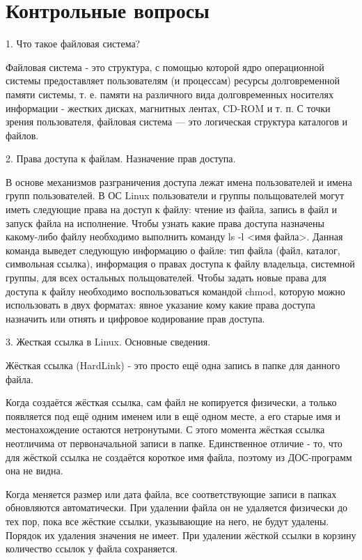 \section*{Контрольные вопросы}
1. Что такое файловая система?

Файловая система - это структура, с помощью которой ядро операционной системы предоставляет пользователям (и процессам) ресурсы долговременной памяти системы, т. е. памяти на различного вида долговременных носителях информации  -  жестких дисках, магнитных лентах, CD-ROM и т. п. С точки зрения пользователя, файловая система   —   это логическая структура каталогов и файлов. 

2. Права доступа к файлам. Назначение прав доступа.

В основе механизмов разграничения доступа лежат имена пользователей и имена групп пользователей. В ОС Linux пользователи и группы польщователей могут иметь следующие права на доступ к файлу: чтение из файла, запись в файл и запуск файла на исполнение. Чтобы узнать какие права доступа назначены какому-либо файлу необходимо выполнить команду ls -l <имя файла>. Данная команда выведет следующую информацию о файле: тип файла (файл, каталог, символьная ссылка), информация о правах доступа к файлу владельца, системной группы, для всех остальных польщователей. Чтобы задать новые права для доступа к файлу необходимо воспользоваться командой chmod, которую можно использовать в двух форматах: явное указание кому какие права доступа назначить или отнять и цифровое кодирование прав доступа.

3. Жесткая ссылка в Linux. Основные сведения.

Жёсткая ссылка (HardLink) - это просто ещё одна запись в папке для данного файла.

Когда создаётся жёсткая ссылка, сам файл не копируется физически, а только появляется под ещё одним именем или в ещё одном месте, а его старые имя и местонахождение остаются нетронутыми. С этого момента жёсткая ссылка неотличима от первоначальной записи в папке. Единственное отличие - то, что для жёсткой ссылка не создаётся короткое имя файла, поэтому из ДОС-программ она не видна.

Когда меняется размер или дата файла, все соответствующие записи в папках обновляются автоматически. При удалении файла он не удаляется физически до тех пор, пока все жёсткие ссылки, указывающие на него, не будут удалены. Порядок их удаления значения не имеет. При удалении жёсткой ссылки в корзину количество ссылок у файла сохраняется.


